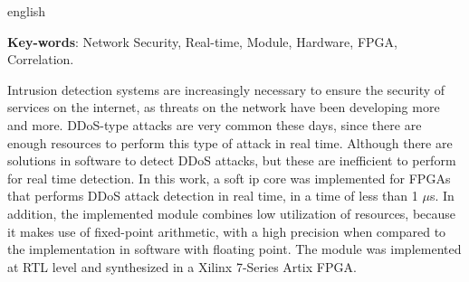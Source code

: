 \begin{resumo}[Abstract]
 \begin{otherlanguage*}{english}
 	
   \noindent 
   \textbf{Key-words}: Network Security, Real-time, Module,
   Hardware, FPGA, Correlation.
   
   Intrusion detection systems are increasingly necessary to ensure the security of services on the internet, as threats on the network have been developing more and more. DDoS-type attacks are very common these days, since there are enough resources to perform this type of attack in real time. Although there are solutions in software to detect DDoS attacks, but these are inefficient to perform for real time detection. In this work, a soft ip core was implemented for FPGAs that performs DDoS attack detection in real time, in a time of less than 1 $\mu$s. In addition, the implemented module combines low utilization of resources, because it makes use of fixed-point arithmetic, with a high precision when compared to the implementation in software with floating point. The module was implemented at RTL level and synthesized in a Xilinx 7-Series Artix FPGA.
 \end{otherlanguage*}
\end{resumo}